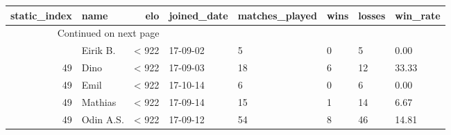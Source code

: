 \begin{longtable}{|r|l|r|l|l|l|l|l|}
\toprule
 static\_index &       name &    elo & joined\_date &  matches\_played &  wins &  losses &  win\_rate \\
\midrule
\endhead
\midrule
\multicolumn{3}{r}{{Continued on next page}} \\
\midrule
\endfoot

\bottomrule
\endlastfoot
           49 &   Eirik B. &  < 922 &    17-09-02 &               5 &     0 &       5 &      0.00 \\
           49 &       Dino &  < 922 &    17-09-03 &              18 &     6 &      12 &     33.33 \\
           49 &       Emil &  < 922 &    17-10-14 &               6 &     0 &       6 &      0.00 \\
           49 &    Mathias &  < 922 &    17-09-14 &              15 &     1 &      14 &      6.67 \\
           49 &  Odin A.S. &  < 922 &    17-09-12 &              54 &     8 &      46 &     14.81 \\
\end{longtable}
